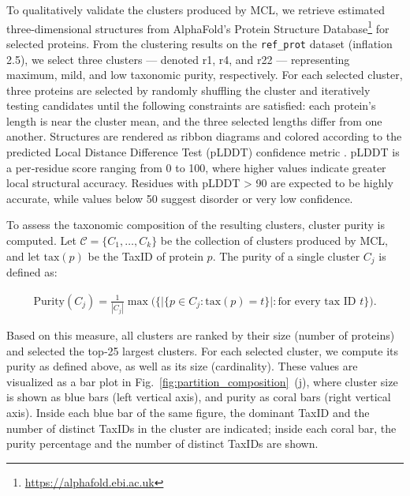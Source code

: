 To qualitatively validate the clusters produced by MCL, we retrieve
estimated three-dimensional structures from AlphaFold's Protein Structure Database\footnote{\url{https://alphafold.ebi.ac.uk}} for selected proteins.
From the clustering results on the \texttt{ref\_prot} dataset (inflation 2.5),
we select three clusters --- denoted r1, r4, and r22 --- representing maximum,
mild, and low taxonomic purity, respectively. For each selected cluster,
three proteins are selected by randomly shuffling the cluster and iteratively
testing candidates until the following constraints are satisfied: each
protein's length is near the cluster mean, and the three selected lengths
differ from one another. Structures are rendered as ribbon diagrams and
colored according to the predicted Local Distance Difference Test (pLDDT)
confidence metric \cite{plddt}. pLDDT is a per‑residue score ranging from 0 to
100, where higher values indicate greater local structural accuracy. Residues
with pLDDT > 90 are expected to be highly accurate, while values below 50
suggest disorder or very low confidence.

To assess the taxonomic composition of the resulting clusters, cluster purity
is computed. Let \(\mathscr{C} = \{C_1, \dots, C_k\}\) be the collection of
clusters produced by MCL, and let \(\text{tax}(p)\) be the TaxID of protein
\(p\). The purity of a single cluster \(C_j\) is defined as:

\begin{align*}
  \text{Purity}(C_j) = \frac{1}{|C_j|} \max \Big( \Big\{ \big| \{ p \in C_j : \text{tax}(p) = t \} \big| : \text{for every tax ID } t \Big\} \Big).
\end{align*}

Based on this measure, all clusters are ranked by their size (number of
proteins) and selected the top‑25 largest clusters. For each selected cluster,
we compute its purity as defined above, as well as its size (cardinality).
These values are visualized as a bar plot in
Fig.~\ref{fig:partition_composition}~(j), where cluster size is shown as blue
bars (left vertical axis), and purity as coral bars (right vertical axis).
Inside each blue bar of the same figure, the dominant TaxID and the number of
distinct TaxIDs in the cluster are indicated; inside each coral bar, the purity
percentage and the number of distinct TaxIDs are shown.
